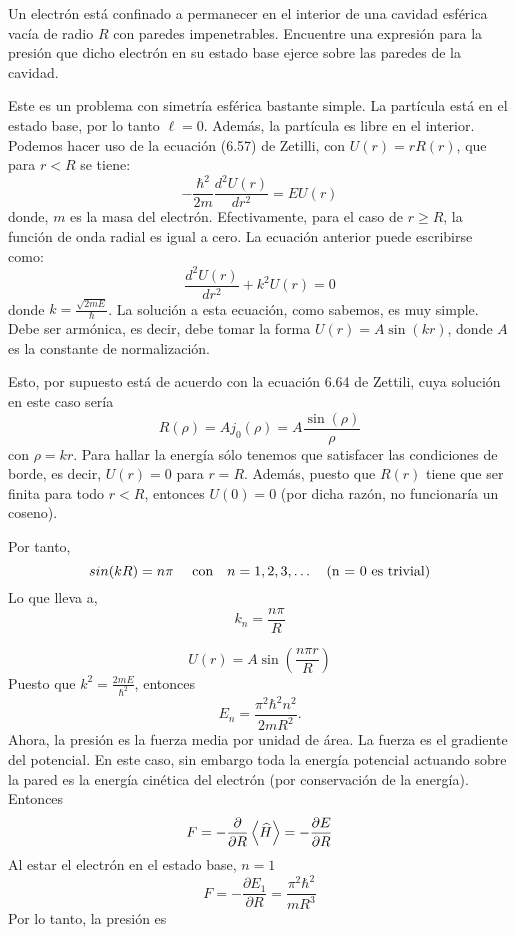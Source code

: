 \question [20]

Un electrón está confinado a permanecer en el interior de una cavidad esférica vacía de radio $R$ con paredes impenetrables. Encuentre una expresión para la presión que dicho electrón en su estado base ejerce sobre las paredes de la cavidad.

\begin{solution}

Este es un problema con simetría esférica bastante simple. La partícula está en el estado base, por lo tanto $\ell =0$. Además, la partícula es libre en el interior.
Podemos hacer uso de la ecuación (6.57) de Zetilli, con $U(r)=rR(r)$, que para $r<R$ se tiene:
\begin{equation*}
-\frac{\hbar^2}{2m}\frac{d^2 U(r)}{dr^2}=E U(r)
\end{equation*} 
donde, $m$ es la masa del electrón. Efectivamente, para el caso de $r \geq R$, la función de onda radial es igual a cero. La ecuación anterior puede escribirse como:
\begin{equation*}
\frac{d^2 U(r)}{dr^2}+k^2U(r)=0
\end{equation*}
donde $k=\frac{\sqrt{2mE}}{\hbar}$. La solución a esta ecuación, como sabemos, es muy simple. Debe ser armónica, es decir, debe tomar la forma $U(r)= A\sin(kr)$, donde $A$ es la constante de normalización.

Esto, por supuesto está de acuerdo con la ecuación 6.64 de Zettili, cuya solución en este caso sería
\begin{equation*}
R(\rho) =Aj_0 (\rho)=A\frac{\sin(\rho)}{\rho}
\end{equation*}
con $\rho=kr$. Para hallar la energía sólo tenemos que satisfacer las condiciones de borde, es decir, $U(r)=0$ para $r=R$. Además, puesto que $R(r)$ tiene que ser finita para todo  $r<R$, entonces $U(0)=0$ (por dicha razón, no funcionaría un coseno).

Por tanto, 
\begin{equation*}
sin(kR)=n\pi  \ \ \ \ \text{con} \quad n=1,2,3, \ldots \notag\quad (\text{n = 0 es trivial})
\end{equation*}
Lo que lleva  a,
\begin{equation*}
k_n=\frac{n\pi}{R}
\end{equation*}

$$U(r)=A\sin(\frac{n\pi r}{R}) $$
Puesto que $k^2=\frac{2mE}{\hbar^2}$, entonces
\begin{equation*}
E_n=\frac{\pi^2\hbar^2n^2}{2mR^2}.
\end{equation*}
Ahora, la presión es la fuerza media por unidad de área. La fuerza es el gradiente del potencial. En este caso, sin embargo toda la energía potencial actuando sobre la pared es la energía cinética del electrón (por conservación de la energía). Entonces
\begin{equation*}
F=-\frac{\partial}{\partial R}\left< \widehat{H} \right>=-\frac{\partial E}{\partial R}
\end{equation*}
Al estar el electrón en el estado base, $n=1$
\begin{equation*}
F=- \frac{\partial E_1}{\partial R}=\frac{\pi^2 \hbar^2}{mR^3}
\end{equation*}
Por lo tanto, la presión es


\end{solution}
